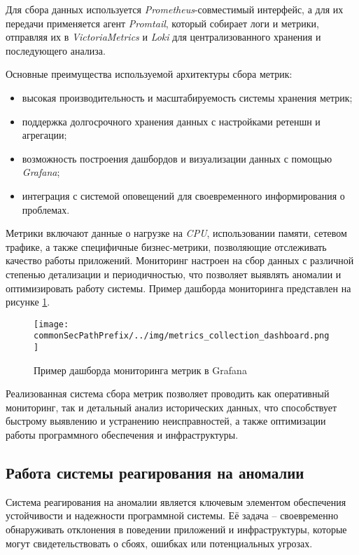 Для сбора данных используется \textit{Prometheus}-совместимый интерфейс, а для их передачи применяется агент \textit{Promtail}, который собирает логи и метрики, отправляя их в \textit{VictoriaMetrics} и \textit{Loki} для централизованного хранения и последующего анализа.

Основные преимущества используемой архитектуры сбора метрик:

\begin{itemize}
    \item высокая производительность и масштабируемость системы хранения метрик;
    \item поддержка долгосрочного хранения данных с настройками ретеншн и агрегации;
    \item возможность построения дашбордов и визуализации данных с помощью \textit{Grafana};
    \item интеграция с системой оповещений для своевременного информирования о проблемах.
\end{itemize}

Метрики включают данные о нагрузке на \textit{CPU}, использовании памяти, сетевом трафике, а также специфичные бизнес-метрики, позволяющие отслеживать качество работы приложений. Мониторинг настроен на сбор данных с различной степенью детализации и периодичностью, что позволяет выявлять аномалии и оптимизировать работу системы. Пример дашборда мониторинга представлен на рисунке \ref{fig:metrics_collection_dashboard}.
\begin{figure}[ht]
    \centering
    \texttt{[image: \\commonSecPathPrefix/../img/metrics\_collection\_dashboard.png]}
    \caption{Пример дашборда мониторинга метрик в Grafana}
    \label{fig:metrics_collection_dashboard}
\end{figure}

Реализованная система сбора метрик позволяет проводить как оперативный мониторинг, так и детальный анализ исторических данных, что способствует быстрому выявлению и устранению неисправностей, а также оптимизации работы программного обеспечения и инфраструктуры.


\subsection{Работа системы реагирования на аномалии}

Система реагирования на аномалии является ключевым элементом обеспечения устойчивости и надежности программной системы. Её задача -- своевременно обнаруживать отклонения в поведении приложений и инфраструктуры, которые могут свидетельствовать о сбоях, ошибках или потенциальных угрозах.

